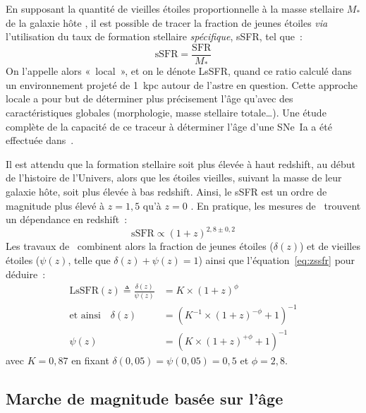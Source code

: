\documentclass[../main/main.tex]{subfiles}
\begin{document}
En supposant la quantité de vieilles étoiles proportionnelle à la masse
stellaire $M_*$ de la galaxie hôte \citep{mannucci2005, scannapieco2005}, il est
possible de tracer la fraction de jeunes étoiles \textit{via} l'utilisation du
taux de formation stellaire \textit{spécifique}, sSFR, tel que~:
\begin{equation}\label{eq:ssfr}
    \mathrm{sSFR} = \frac{\mathrm{SFR}}{M_*}
\end{equation}
On l'appelle alors «~local~», et on le dénote LsSFR, quand ce ratio calculé dans
un environnement projeté de \SI{1}{kpc} autour de l'astre en question. Cette
approche locale a pour but de déterminer plus précisement l'âge qu'avec des
caractéristiques globales (morphologie, masse stellaire totale…). Une étude
complète de la capacité de ce traceur à déterminer l'âge d'une SNe~Ia a été
effectuée dans~\cite{briday2021, briday2022}.

Il est attendu que la formation stellaire soit plus élevée à haut redshift, au
début de l'histoire de l'Univers, alors que les étoiles vieilles, suivant la
masse de leur galaxie hôte, soit plus élevée à bas redshift. Ainsi, le sSFR est
un ordre de magnitude plus élevé à $z = 1,5$ qu'à $z = 0$ \citep[voir][pour une
étude complète]{madau2015}. En pratique, les mesures de~\cite{tasca2015}
trouvent un dépendance en redshift~:
\begin{equation}\label{eq:zssfr}
    \mathrm{sSFR} \propto (1+z)^{2,8 \pm 0,2}
\end{equation}
Les travaux de~\cite{rigault2020} combinent alors la fraction de jeunes étoiles
($\delta(z)$) et de vieilles étoiles ($\psi(z)$, telle que $\delta(z) + \psi(z)
= 1$) ainsi que l'équation~\ref{eq:zssfr} pour déduire~:
\begin{align}\label{eq:dpz}
    \mathrm{LsSFR}(z) \triangleq \frac{\delta(z)}{\psi(z)} &=
        K\times(1+z)^{\phi} \\\label{eq:deltaz}
    \text{et ainsi}\quad
    \delta(z) & = \left( K^{-1}\times(1+z)^{-\phi} +1 \right)^{-1}
    \\\label{eq:psiz}
    \psi(z)   & = \left( K\times(1+z)^{+\phi} +1 \right)^{-1}
\end{align}
avec $K=0,87$ en fixant $\delta(0,05) = \psi(0,05) = 0,5$ et $\phi = 2,8$.
\subsection{Marche de magnitude basée sur l'âge}\label{sssec:astep}

\newpage

\minilof
\minilot

% 
% 
\end{document}

